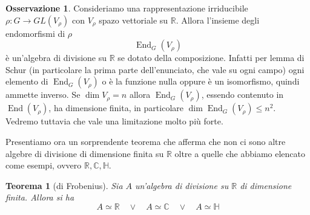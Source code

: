 \documentclass[11pt]{article}
\theoremstyle{plain}
\newtheorem{thm}{Teorema}[section]
\theoremstyle{definition}
\newtheorem*{rem}{Osservazione}
\theoremstyle{remark}
\newcommand{\C}{\mathbb{C}}
\newcommand{\R}{\mathbb{R}}
\newcommand{\HH}{\mathbb{H}}
\DeclareMathOperator{\End}{End}
\DeclareMathOperator{\iso}{\simeq}
\begin{document}
\begin{rem}
Consideriamo una rappresentazione irriducibile $\rho:G\to GL(V_\rho)$ con $V_\rho$ spazo vettoriale su $\R$. Allora l'insieme degli endomorfismi
di $\rho$
\[ \End_G(V_\rho)\]
è un'algebra di divisione su $\R$ se dotato della composizione.
Infatti per lemma di Schur (in particolare la prima parte dell'enunciato, che vale su ogni campo) ogni elemento di $\End_G(V_\rho)$ o è la funzione nulla oppure è un isomorfismo, quindi ammette inverso.
Se $\dim V_\rho = n$ allora $\End_G(V_\rho)$, essendo contenuto in $\End(V_\rho)$, ha dimensione finita, in particolare $\dim \End_G(V_\rho)\le n^2$.
Vedremo tuttavia che vale una limitazione molto più forte.
\end{rem}


Presentiamo ora un sorprendente teorema che afferma che non ci sono altre algebre di divisione di dimensione finita su $\R$ oltre a quelle che abbiamo elencato come esempi, ovvero $\R, \C, \HH$.
\begin{thm}[di Frobenius]
\label{thm: frobenius}
Sia $A$ un'algebra di divisione su $\R$ di dimensione finita. Allora si ha
\[A \iso \R \quad \vee \quad  A \iso \C \quad \vee \quad A  \iso \HH \]
\end{thm}
\end{document}
